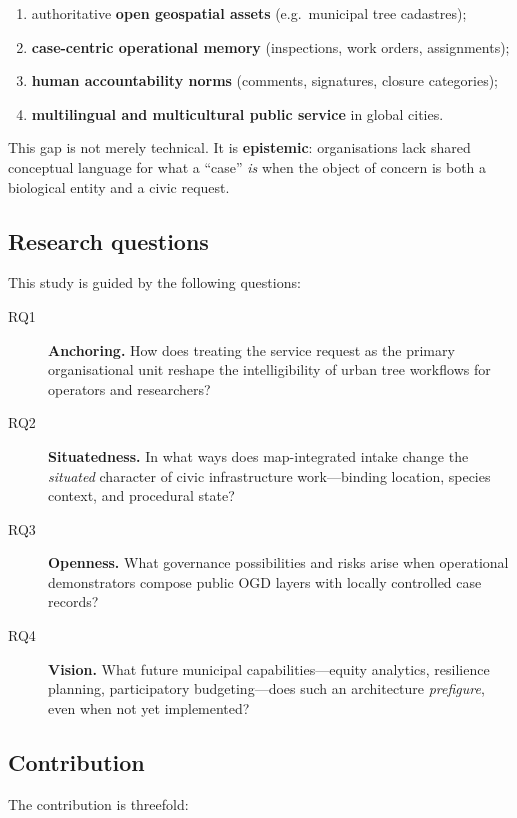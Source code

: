 \documentclass[12pt,a4paper]{article}
\begin{document}
\begin{enumerate}[label=(\roman*)]
    \item authoritative \textbf{open geospatial assets} (e.g.\ municipal tree cadastres);
    \item \textbf{case-centric operational memory} (inspections, work orders, assignments);
    \item \textbf{human accountability norms} (comments, signatures, closure categories);
    \item \textbf{multilingual and multicultural public service} in global cities.
\end{enumerate}

This gap is not merely technical. It is \textbf{epistemic}: organisations lack shared conceptual language for what a ``case'' \emph{is} when the object of concern is both a biological entity and a civic request.

\subsection{Research questions}

This study is guided by the following questions:

\begin{description}
    \item[RQ1] \textbf{Anchoring.} How does treating the service request as the primary organisational unit reshape the intelligibility of urban tree workflows for operators and researchers?
    \item[RQ2] \textbf{Situatedness.} In what ways does map-integrated intake change the \emph{situated} character of civic infrastructure work---binding location, species context, and procedural state?
    \item[RQ3] \textbf{Openness.} What governance possibilities and risks arise when operational demonstrators compose public OGD layers with locally controlled case records?
    \item[RQ4] \textbf{Vision.} What future municipal capabilities---equity analytics, resilience planning, participatory budgeting---does such an architecture \emph{prefigure}, even when not yet implemented?
\end{description}

\subsection{Contribution}

The contribution is threefold:
\end{document}
